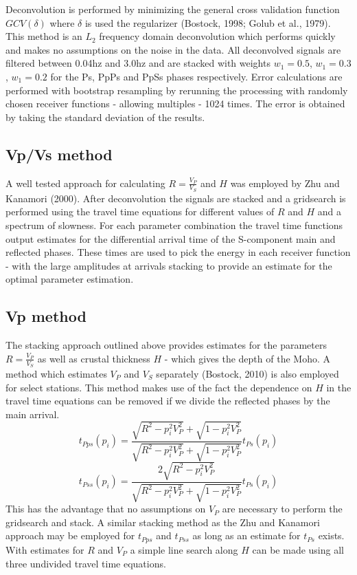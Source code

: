 \documentclass[draft, 12pt]{article}
\begin{document}
   Deconvolution is performed by minimizing the general cross validation function $GCV(\delta)$ where $\delta$ is used the regularizer (Bostock, 1998; Golub et al., 1979). This method is an $L_2$ frequency domain deconvolution which performs quickly and makes no assumptions on the noise in the data. All deconvolved signals are filtered between 0.04hz and 3.0hz and are stacked with weights $w_1=0.5$, $w_1=0.3$, $w_1=0.2$ for the Ps, PpPs and PpSs phases respectively. Error calculations are performed with bootstrap resampling by rerunning the processing with randomly chosen receiver functions - allowing multiples - 1024 times. The error is obtained by taking the standard deviation of the results.

\subsection{Vp/Vs method}
   A well tested approach for calculating $R=\frac{V_P}{V_S}$ and $H$ was employed by Zhu and Kanamori (2000). After deconvolution the signals are stacked and a gridsearch is performed using the travel time equations for different values of $R$ and $H$ and a spectrum of slowness. For each parameter combination the travel time functions output estimates for the differential arrival time of the S-component main and reflected phases. These times are used to pick the energy in each receiver function - with the large amplitudes at arrivals stacking to provide an estimate for the optimal parameter estimation.

\subsection{Vp method}
   The stacking approach outlined above provides estimates for the parameters $R=\frac{V_P}{V_S}$ as well as crustal thickness $H$ - which gives the depth of the Moho. A method which estimates $V_P$ and $V_S$ separately (Bostock, 2010) is also employed for select stations. This method makes use of the fact the dependence on $H$ in the travel time equations can be removed if we divide the reflected phases by the main arrival.
$$ t_{Pps}(p_i) = \frac{ \sqrt{R^2-p_i^2V_P^2} + \sqrt{1-p_i^2V_P^2} } {\sqrt{R^2-p_i^2V_P^2} + \sqrt{1-p_i^2V_P^2} } t_{Ps}(p_i) $$
$$ t_{Pss}(p_i) = \frac{2\sqrt{R^2-p_i^2V_P^2}} {\sqrt{R^2-p_i^2V_P^2} + \sqrt{1-p_i^2V_P^2} } t_{Ps}(p_i) $$
This has the advantage that no assumptions on $V_P$ are necessary to perform the gridsearch and stack. A similar stacking method as the Zhu and Kanamori approach may be employed for $t_{Pps}$ and $t_{Pss}$ as long as an estimate for $t_{Ps}$ exists. With estimates for $R$ and $V_P$ a simple line search along $H$ can be made using all three undivided travel time equations.
\end{document}

